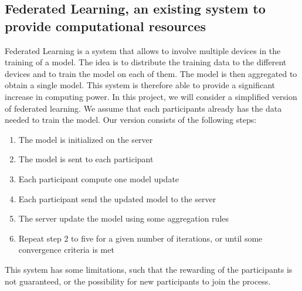 \documentclass{article}
\begin{document}
\subsection{Federated Learning, an existing system to provide computational resources}
Federated Learning is a system that allows to involve multiple devices in the training of a model. The idea is to
distribute the training data to the different devices and to train the model on each of them. The model is then
aggregated to obtain a single model. This system is therefore able to provide a significant increase in computing power.
In this project, we will consider a simplified version of federated learning. We assume that each participants
already has the data needed to train the model. Our version consists of the following steps:
\begin{enumerate}
    \item The model is initialized on the server
    \item The model is sent to each participant
    \item Each participant compute one model update
    \item Each participant send the updated model to the server
    \item The server update the model using some aggregation rules
    \item Repeat step 2 to five for a given number of iterations, or until some convergence criteria is met
\end{enumerate}
This system has some limitations, such that the rewarding of the participants is not guaranteed, or the possibility for
new participants to join the process.
\end{document}
